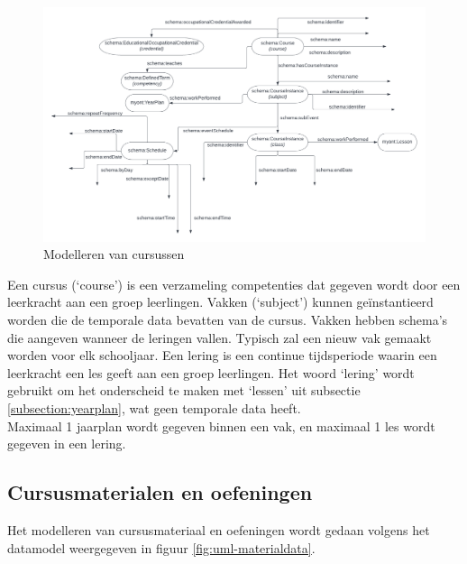 \documentclass[12pt,journal]{IEEEtran}
\begin{document}
	\begin{figure}[h]
		\caption{Modelleren van cursussen}
		\label{fig:uml-courses}
		\includegraphics[scale=0.35]{uml-courses.png}
	\end{figure}
	\noindent Een cursus (`course') is een verzameling competenties dat gegeven wordt door een leerkracht aan een groep leerlingen.
	Vakken (`subject') kunnen geïnstantieerd worden die de temporale data bevatten van de cursus. Vakken hebben schema's die aangeven wanneer de leringen vallen.
	Typisch zal een nieuw vak gemaakt worden voor elk schooljaar.
	Een lering is een continue tijdsperiode waarin een leerkracht een les geeft aan een groep leerlingen.
	Het woord `lering' wordt gebruikt om het onderscheid te maken met `lessen' uit subsectie \ref{subsection:yearplan}, wat geen temporale data heeft.\\
	Maximaal 1 jaarplan wordt gegeven binnen een vak, en maximaal 1 les wordt gegeven in een lering.

	\subsection{Cursusmaterialen en oefeningen}
	\noindent Het modelleren van cursusmateriaal en oefeningen wordt gedaan volgens het datamodel weergegeven in figuur \ref{fig:uml-materialdata}.
\end{document}
